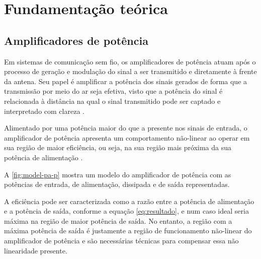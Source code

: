 \chapter{Fundamentação teórica} \label{cha:fundteo}

\section{Amplificadores de potência} \label{sec:fundteo-pa}

Em sistemas de comunicação sem fio, os amplificadores de potência atuam após o processo de geração e modulação do sinal a ser transmitido e diretamente à frente da antena. Seu papel é amplificar a potência dos sinais gerados de forma que a transmissão por meio do ar seja efetiva, visto que a potência do sinal é relacionada à distância na qual o sinal transmitido pode ser captado e interpretado com clareza \cite{raychaudhuri_frontiers_2012}.

Alimentado por uma potência maior do que a presente nos sinais de entrada, o amplificador de potência apresenta um comportamento não-linear ao operar em sua região de maior eficiência, ou seja, na sua região mais próxima da sua potência de alimentação \cite{cripps_rf_2006}.

A \autoref{fig:model-pa-p} mostra um modelo do amplificador de potência com as potências de entrada, de alimentação, dissipada e de saída representadas.


A eficiência \label{item:efi} pode ser caracterizada como a razão entre a potência de alimentação e a potência de saída, conforme a equação \ref{eq:resultado}, e num caso ideal seria máxima na região de maior potência de saída. No entanto, a região com a máxima potência de saída é justamente a região de funcionamento não-linear do amplificador de potência e são necessárias técnicas para compensar essa não linearidade presente.


